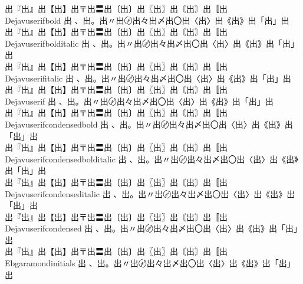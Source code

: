 \begin{tabbing}
\> {\mktsFontfileDejavusansmono{}出『出』出【出】出〒出〓出〔出〕出〖出〗出〘出〙出〚出} \\
Dejavuserifbold \> {\mktsFontfileDejavuserifbold{}出 、出。出〃出〄出々出〆出〇出〈出〉出《出》出「出」出}\\
\> {\mktsFontfileDejavuserifbold{}出『出』出【出】出〒出〓出〔出〕出〖出〗出〘出〙出〚出} \\
Dejavuserifbolditalic \> {\mktsFontfileDejavuserifbolditalic{}出 、出。出〃出〄出々出〆出〇出〈出〉出《出》出「出」出}\\
\> {\mktsFontfileDejavuserifbolditalic{}出『出』出【出】出〒出〓出〔出〕出〖出〗出〘出〙出〚出} \\
Dejavuserifitalic \> {\mktsFontfileDejavuserifitalic{}出 、出。出〃出〄出々出〆出〇出〈出〉出《出》出「出」出}\\
\> {\mktsFontfileDejavuserifitalic{}出『出』出【出】出〒出〓出〔出〕出〖出〗出〘出〙出〚出} \\
Dejavuserif \> {\mktsFontfileDejavuserif{}出 、出。出〃出〄出々出〆出〇出〈出〉出《出》出「出」出}\\
\> {\mktsFontfileDejavuserif{}出『出』出【出】出〒出〓出〔出〕出〖出〗出〘出〙出〚出} \\
Dejavuserifcondensedbold \> {\mktsFontfileDejavuserifcondensedbold{}出 、出。出〃出〄出々出〆出〇出〈出〉出《出》出「出」出}\\
\> {\mktsFontfileDejavuserifcondensedbold{}出『出』出【出】出〒出〓出〔出〕出〖出〗出〘出〙出〚出} \\
Dejavuserifcondensedbolditalic \> {\mktsFontfileDejavuserifcondensedbolditalic{}出 、出。出〃出〄出々出〆出〇出〈出〉出《出》出「出」出}\\
\> {\mktsFontfileDejavuserifcondensedbolditalic{}出『出』出【出】出〒出〓出〔出〕出〖出〗出〘出〙出〚出} \\
Dejavuserifcondenseditalic \> {\mktsFontfileDejavuserifcondenseditalic{}出 、出。出〃出〄出々出〆出〇出〈出〉出《出》出「出」出}\\
\> {\mktsFontfileDejavuserifcondenseditalic{}出『出』出【出】出〒出〓出〔出〕出〖出〗出〘出〙出〚出} \\
Dejavuserifcondensed \> {\mktsFontfileDejavuserifcondensed{}出 、出。出〃出〄出々出〆出〇出〈出〉出《出》出「出」出}\\
\> {\mktsFontfileDejavuserifcondensed{}出『出』出【出】出〒出〓出〔出〕出〖出〗出〘出〙出〚出} \\
Ebgaramondinitials \> {\mktsFontfileEbgaramondinitials{}出 、出。出〃出〄出々出〆出〇出〈出〉出《出》出「出」出}\\

\end{tabbing}
